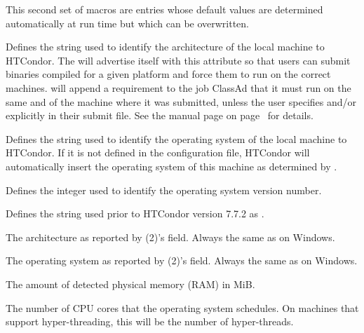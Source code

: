 This second set of macros are entries whose default values are
determined automatically at run time but which can be overwritten.  
\begin{description}

\label{param:Arch}
\item[\MacroU{ARCH}]
  Defines the string
  used to identify the architecture of the local machine to HTCondor.
  The  will advertise itself with this attribute so
  that users can submit binaries compiled for a given platform and
  force them to run on the correct machines.   will
  append a requirement to the job ClassAd that it must
  run on the same  and  of the machine where
  it was submitted, unless the user specifies  and/or
   explicitly in their submit file.
  See the  manual page
  on page~\pageref{man-condor-submit} for details.

\label{param:OpSys}
\item[\MacroU{OPSYS}]
  Defines the string used to identify the operating system
  of the local machine to HTCondor.
  If it is not defined in the configuration file, HTCondor will
  automatically insert the operating system of this machine as
  determined by .

\label{param:OpSysVer}
\item[\MacroU{OPSYS\_VER}]
  Defines the integer used to identify the operating system version number.

\label{param:OpSysAndVer}
\item[\MacroU{OPSYS\_AND\_VER}]
  Defines the string used prior to HTCondor version 7.7.2 as .

\label{param:UnameArch}
\item[\MacroU{UNAME\_ARCH}]
  The architecture as reported by (2)'s  field.
  Always the same as  on Windows.

\label{param:UnameOpsys}
\item[\MacroU{UNAME\_OPSYS}]
  The operating system as reported by (2)'s  field.
  Always the same as  on Windows.

\label{param:DetectedMemory}
\item[\MacroU{DETECTED\_MEMORY}]
  The amount of detected physical memory (RAM) in MiB.

\label{param:DetectedCores}
\item[\MacroU{DETECTED\_CORES}]
  The number of CPU cores that the operating system schedules.
  On machines that support hyper-threading, this will be 
  the number of hyper-threads.


\end{description}
